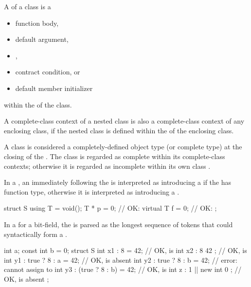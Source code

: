 \pnum
{}%
A  of a class is a
\begin{itemize}
\item function body,
\item default argument,
\item {},
\item contract condition, or
\item default member initializer
\end{itemize}
within the  of the class.
\begin{note}
A complete-class context of a nested class is also a complete-class
context of any enclosing class, if the nested class is defined within
the  of the enclosing class.
\end{note}

\pnum
A class is considered a completely-defined object
type (or complete type) at the closing \tcode{\}} of
the .
The class is regarded as complete within its complete-class contexts;
otherwise it is regarded as incomplete within its own class
.

\pnum
In a ,
an \tcode{=} immediately following the 
is interpreted as introducing a 
if the  has function type,
otherwise it is interpreted as introducing
a .
\begin{example}
\begin{codeblock}
struct S {
  using T = void();
  T * p = 0;        // OK: 
  virtual T f = 0;  // OK: 
};
\end{codeblock}
\end{example}

\pnum
In a  for a bit-field,
the  is parsed as
the longest sequence of tokens
that could syntactically form a .
\begin{example}
\begin{codeblock}
int a;
const int b = 0;
struct S {
  int x1 : 8 = 42;               // OK,  is 
  int x2 : 8 { 42 };             // OK,  is 
  int y1 : true ? 8 : a = 42;    // OK,  is absent
  int y2 : true ? 8 : b = 42;    // error: cannot assign to 
  int y3 : (true ? 8 : b) = 42;  // OK,  is 
  int z : 1 || new int { 0 };    // OK,  is absent
};
\end{codeblock}
\end{example}

